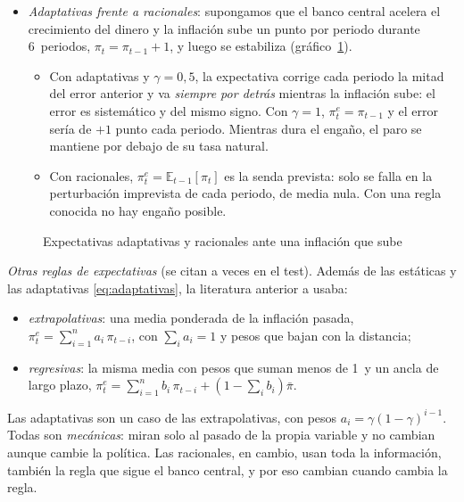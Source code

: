 \documentclass[11pt]{article}
\begin{document}
\begin{itemize}
\item \emph{Adaptativas frente a racionales}: supongamos que el banco central acelera el crecimiento del dinero y la inflación sube un punto por periodo durante 6~periodos, $\pi_t=\pi_{t-1}+1$, y luego se estabiliza (gráfico~\ref{fig:expectativas}).
  \begin{itemize}
  \item Con adaptativas y $\gamma=0{,}5$, la expectativa corrige cada periodo la mitad del error anterior y va \emph{siempre por detrás} mientras la inflación sube: el error es sistemático y del mismo signo. Con $\gamma=1$, $\pi^e_t=\pi_{t-1}$ y el error sería de $+1$ punto cada periodo. Mientras dura el engaño, el paro se mantiene por debajo de su tasa natural.
  \item Con racionales, $\pi^e_t=\mathbb{E}_{t-1}[\pi_t]$ es la senda prevista: solo se falla en la perturbación imprevista de cada periodo, de media nula. Con una regla conocida no hay engaño posible.
  \end{itemize}
\end{itemize}

\begin{figure}[H]
\centering
\caption{Expectativas adaptativas y racionales ante una inflación que sube}\label{fig:expectativas}
\end{figure}

\begin{anotaciones}
\emph{Otras reglas de expectativas} (se citan a veces en el test). Además de las estáticas y las adaptativas \eqref{eq:adaptativas}, la literatura anterior a  usaba:
\begin{itemize}
\item \emph{extrapolativas}: una media ponderada de la inflación pasada, $\pi^e_t=\sum_{i=1}^{n}a_i\,\pi_{t-i}$, con $\sum_i a_i=1$ y pesos que bajan con la distancia;
\item \emph{regresivas}: la misma media con pesos que suman menos de 1~y un ancla de largo plazo, $\pi^e_t=\sum_{i=1}^{n}b_i\,\pi_{t-i}+\left(1-\sum_i b_i\right)\bar\pi$.
\end{itemize}
Las adaptativas son un caso de las extrapolativas, con pesos $a_i=\gamma(1-\gamma)^{i-1}$. Todas son \emph{mecánicas}: miran solo al pasado de la propia variable y no cambian aunque cambie la política. Las racionales, en cambio, usan toda la información, también la regla que sigue el banco central, y por eso cambian cuando cambia la regla.
\end{anotaciones}
\end{document}
